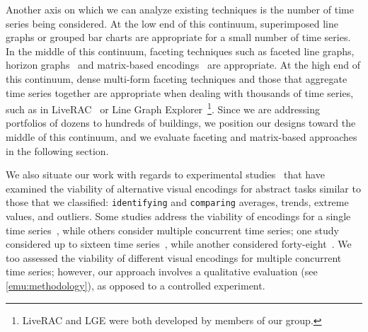 Another axis on which we can analyze existing techniques is the number of time series being considered.
At the low end of this continuum, superimposed line graphs or grouped bar charts are appropriate for a small number of time series. 
In the middle of this continuum, faceting techniques such as faceted line graphs, horizon graphs~\cite{Heer2009} and matrix-based encodings~\cite{Hao2007,Shimabukuro2004} are appropriate.
At the high end of this continuum, dense multi-form faceting techniques and those that aggregate time series together are appropriate when dealing with thousands of time series, such as in LiveRAC~\cite{McLachlan2008} or Line Graph Explorer~\cite{Lam2007}\footnote{LiveRAC and LGE were both developed by members of our group.}. 
Since we are addressing portfolios of dozens to hundreds of buildings, we position our designs toward the middle of this continuum, and we evaluate faceting and matrix-based approaches in the following section.

 We also situate our work with regards to experimental studies~\cite{Albers2014,Correll2012,Fuchs2013,Javed2010} that have examined the viability of alternative visual encodings for abstract tasks similar to those that we classified: {\tt identifying} and {\tt comparing} averages, trends, extreme values, and outliers.
Some studies address the viability of encodings for a single time series~\cite{Albers2014,Correll2012}, while others consider multiple concurrent time series; one study considered up to sixteen time series~\cite{Javed2010}, while another considered forty-eight~\cite{Fuchs2013}.
We too assessed the viability of different visual encodings for multiple concurrent time series; however, our approach involves a qualitative evaluation (see \autoref{emu:methodology}), as opposed to a controlled experiment.

